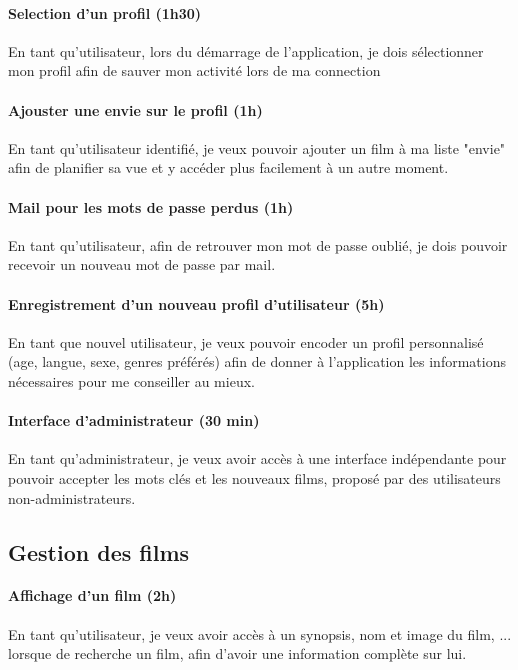 \documentclass[a4paper,12pt]{article}
\begin{document}
\paragraph{Selection d'un profil (1h30)}
En tant qu'utilisateur, lors du démarrage de l'application, je dois sélectionner mon profil afin de sauver mon activité lors de ma connection

\paragraph{Ajouster une envie sur le profil (1h)}
En tant qu'utilisateur identifié, je veux pouvoir ajouter un film à ma liste "envie" afin de planifier sa vue et y accéder plus facilement à un autre moment.

\paragraph{Mail pour les mots de passe perdus (1h)}
En tant qu'utilisateur, afin de retrouver mon mot de passe oublié, je dois pouvoir recevoir un nouveau mot de passe par mail.

\paragraph{Enregistrement d'un nouveau profil d'utilisateur (5h)}
En tant que nouvel utilisateur, je veux pouvoir encoder un profil personnalisé (age, langue, sexe, genres préférés) afin de donner à l'application les informations nécessaires pour me conseiller au mieux.

\paragraph{Interface d'administrateur (30 min)}
En tant qu'administrateur, je veux avoir accès à une interface indépendante pour pouvoir accepter les mots clés et les nouveaux films, proposé par des utilisateurs non-administrateurs.

\subsection{Gestion des films}

\paragraph{Affichage d'un film (2h)}
En tant qu'utilisateur, je veux avoir accès à un synopsis, nom et image du film, ... lorsque de recherche un film, afin d'avoir une information complète sur lui.
\end{document}
